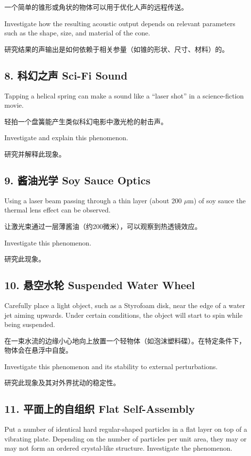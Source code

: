 \documentclass[a4paper,10pt,english]{sphinxmanual}
\begin{document}
一个简单的锥形或角状的物体可以用于优化人声的远程传送。

Investigate how the resulting acoustic output depends on relevant parameters such as the shape, size, and material of the cone.

研究结果的声输出是如何依赖于相关参量（如锥的形状、尺寸、材料）的。


\subsection{8. 科幻之声 Sci-Fi Sound}
\label{\detokenize{7. Appendix:sci-fi-sound}}
Tapping a helical spring can make a sound like a “laser shot” in a science-fiction movie.

轻拍一个盘簧能产生类似科幻电影中激光枪的射击声。

Investigate and explain this phenomenon.

研究并解释此现象。


\subsection{9. 酱油光学 Soy Sauce Optics}
\label{\detokenize{7. Appendix:soy-sauce-optics}}
Using a laser beam passing through a thin layer (about 200 \(\mu\)m) of soy sauce the thermal lens effect can be observed.

让激光束通过一层薄酱油（约200微米），可以观察到热透镜效应。

Investigate this phenomenon.

研究此现象。


\subsection{10. 悬空水轮 Suspended Water Wheel}
\label{\detokenize{7. Appendix:suspended-water-wheel}}
Carefully place a light object, such as a Styrofoam disk, near the edge of a water jet aiming upwards. Under certain conditions, the object will start to spin while being suspended.

在一束水流的边缘小心地向上放置一个轻物体（如泡沫塑料碟）。在特定条件下，物体会在悬浮中自旋。

Investigate this phenomenon and its stability to external perturbations.

研究此现象及其对外界扰动的稳定性。


\subsection{11. 平面上的自组织 Flat Self-Assembly}
\label{\detokenize{7. Appendix:flat-self-assembly}}
Put a number of identical hard regular-shaped particles in a flat layer on top of a vibrating plate. Depending on the number of particles per unit area, they may or may not form an ordered crystal-like structure. Investigate the phenomenon.
\end{document}

